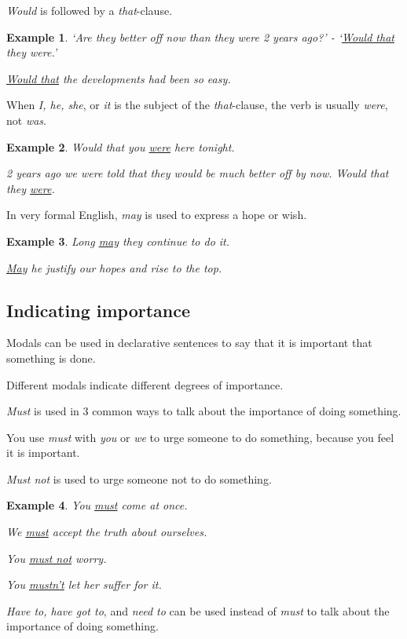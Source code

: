 \documentclass[oneside]{book}
\numberwithin{equation}{section}
\newtheorem{example}{Example}[section]
\begin{document}
\textit{Would} is followed by a \textit{that}-clause.
\begin{example}
    `Are they better off now than they were 2 years ago?' - `\underline{Would that} they were.'
    
    \underline{Would that} the developments had been so easy.
\end{example}
When \textit{I, he, she}, or \textit{it} is the subject of the \textit{that}-clause, the verb is usually \textit{were}, not \textit{was}.
\begin{example}
    Would that you \underline{were} here tonight.
    
    2 years ago we were told that they would be much better off by now. Would that they \underline{were}.
\end{example}
%
\noindent{} In very formal English, \textit{may} is used to express a hope or wish.
\begin{example}
    Long \underline{may} they continue to do it.
    
    \underline{May} he justify our hopes and rise to the top.
\end{example}

\subsection{Indicating importance}
\noindent{} Modals can be used in declarative sentences to say that it is important that something is done.

Different modals indicate different degrees of importance.

%
\noindent{} \textit{Must} is used in 3 common ways to talk about the importance of doing something.

%
You use \textit{must} with \textit{you} or \textit{we} to urge someone to do something, because you feel it is important.

\textit{Must not} is used to urge someone not to do something.
\begin{example}
    You \underline{must} come at once.
    
    We \underline{must} accept the truth about ourselves.
    
    You \underline{must not} worry.
    
    You \underline{mustn't} let her suffer for it.
\end{example}
\textit{Have to, have got to}, and \textit{need to} can be used instead of \textit{must} to talk about the importance of doing something.
\end{document}
